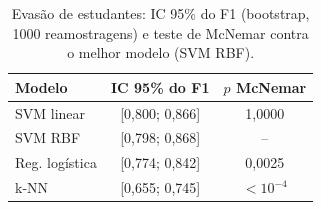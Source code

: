 \begin{table}[!t]
\centering
\caption{Evasão de estudantes: IC 95\% do F1 (bootstrap, 1000 reamostragens) e teste de McNemar contra o melhor modelo (SVM RBF).}
\label{tab:estudantes_sig}
\begin{tabular}{lcc}
\hline
Modelo & IC 95\% do F1 & $p$ McNemar \\
\hline
SVM linear & [0,800; 0,866] & 1,0000 \\
SVM RBF & [0,798; 0,868] & -- \\
Reg. logística & [0,774; 0,842] & 0,0025 \\
k-NN & [0,655; 0,745] & $<10^{-4}$ \\
\hline
\end{tabular}
\end{table}